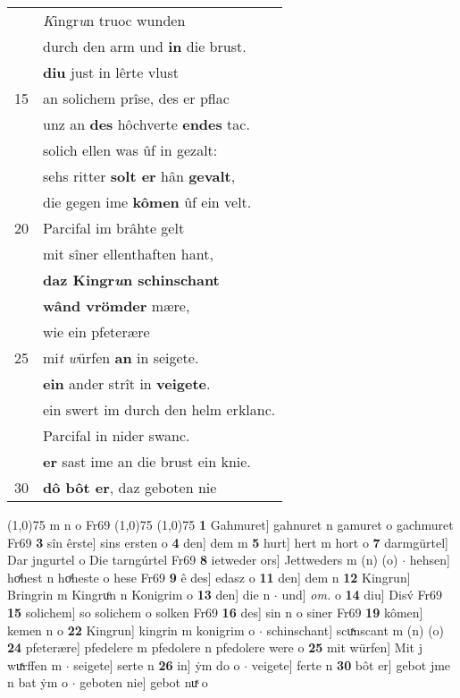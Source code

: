 \documentclass[8pt,a4paper,notitlepage]{article}
\begin{document}
\begin{table}[ht]
\begin{minipage}[t]{0.5\linewidth}
\begin{tabular}{rl}
 & \textit{K}ingr\textit{u}n truoc wunden\\ 
 & durch den arm und \textbf{in} die brust.\\ 
 & \textbf{diu} just in lêrte vlust\\ 
15 & an solichem prîse, des er pflac\\ 
 & unz an \textbf{des} hôchverte \textbf{endes} tac.\\ 
 & solich ellen was ûf in gezalt:\\ 
 & sehs ritter \textbf{solt er} hân \textbf{gevalt},\\ 
 & die gegen ime \textbf{kômen} ûf ein velt.\\ 
20 & Parcifal im brâhte gelt\\ 
 & mit sîner ellenthaften hant,\\ 
 & \textbf{daz Kingr\textit{u}n schinschant}\\ 
 & \textbf{wând vrömder} mære,\\ 
 & wie ein pfeterære\\ 
25 & mi\textit{t} \textit{w}ürfen \textbf{an} in seigete.\\ 
 & \textbf{ein} ander strît in \textbf{veigete}.\\ 
 & ein swert im durch den helm erklanc.\\ 
 & Parcifal in nider swanc.\\ 
 & \textbf{er} sast ime an die brust ein knie.\\ 
30 & \textbf{dô bôt er}, daz geboten nie\\ 
\end{tabular}
\scriptsize
\line(1,0){75} \newline
m n o Fr69 \newline
\line(1,0){75} \newline
\newline
\line(1,0){75} \newline
\textbf{1} Gahmuret] gahnuret n gamuret o gachmuret Fr69 \textbf{3} sîn êrste] sins ersten o \textbf{4} den] dem m \textbf{5} hurt] hert m hort o \textbf{7} darmgürtel] Dar jngurtel o Die tarngúrtel Fr69 \textbf{8} ietweder ors] Jettweders m (n) (o)  $\cdot$ hehsen] hoͯhest n hoͯheste o hese Fr69 \textbf{9} ê des] edasz o \textbf{11} den] dem n \textbf{12} Kingrun] Bringrin m Kingruͦn n Konigrim o \textbf{13} den] die n  $\cdot$ und] \textit{om.} o \textbf{14} diu] Disv́ Fr69 \textbf{15} solichem] so solichem o solken Fr69 \textbf{16} des] sin n o siner Fr69 \textbf{19} kômen] kemen n o \textbf{22} Kingrun] kingrin m konigrim o  $\cdot$ schinschant] scuͯnscant m (n) (o) \textbf{24} pfeterære] pfedelere m pfedolere n pfedolere were o \textbf{25} mit würfen] Mit j wuͯrffen m  $\cdot$ seigete] serte n \textbf{26} in] ẏm do o  $\cdot$ veigete] ferte n \textbf{30} bôt er] gebot jme n bat ẏm o  $\cdot$ geboten nie] gebot nuͯ o \newline
\end{minipage}
\end{table}
\end{document}
